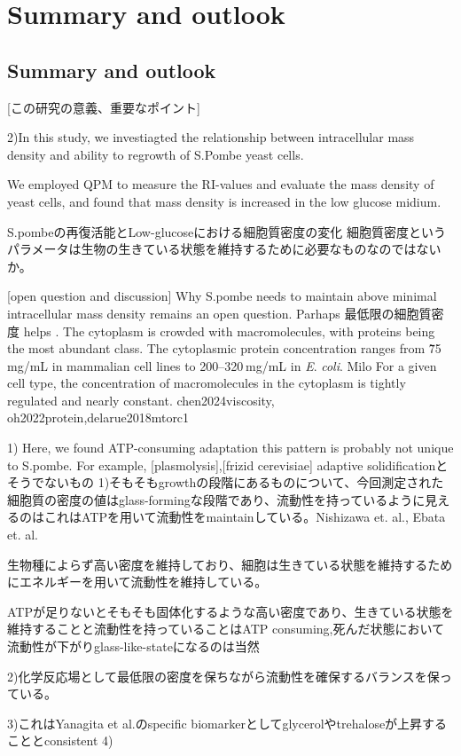 \chapter{Summary and outlook}
\section{Summary and outlook}
[この研究の意義、重要なポイント]

2)In this study, we investiagted the relationship between intracellular mass density and ability to regrowth of S.Pombe yeast cells.

We employed QPM to measure the RI-values and evaluate the mass density of yeast cells, and found that mass density is increased in the low glucose midium.

S.pombeの再復活能とLow-glucoseにおける細胞質密度の変化
細胞質密度というパラメータは生物の生きている状態を維持するために必要なものなのではないか。


[open question and discussion]
Why S.pombe needs to maintain above minimal intracellular mass density remains an open question. 
Parhaps 最低限の細胞質密度 helps .
The cytoplasm is crowded with macromolecules, with proteins being the most abundant class. 
The cytoplasmic protein concentration ranges from \~75 mg/mL in mammalian cell lines to 200–320 mg/mL in \textit{E}. \textit{coli}. Milo
For a given cell type, the concentration of macromolecules in the cytoplasm is tightly regulated and nearly constant. chen2024viscosity, oh2022protein,delarue2018mtorc1

1) Here, we found ATP-consuming adaptation
this pattern is probably not unique to S.pombe. For example, [plasmolysis],[frizid cerevisiae]
adaptive solidificationとそうでないもの
1)そもそもgrowthの段階にあるものについて、今回測定された細胞質の密度の値はglass-formingな段階であり、流動性を持っているように見えるのはこれはATPを用いて流動性をmaintainしている。Nishizawa et. al., Ebata et. al.

生物種によらず高い密度を維持しており、細胞は生きている状態を維持するためにエネルギーを用いて流動性を維持している。

ATPが足りないとそもそも固体化するような高い密度であり、生きている状態を維持することと流動性を持っていることはATP consuming,死んだ状態において流動性が下がりglass-like-stateになるのは当然

2)化学反応場として最低限の密度を保ちながら流動性を確保するバランスを保っている。

3)これはYanagita et al.のspecific biomarkerとしてglycerolやtrehaloseが上昇することとconsistent
4)


